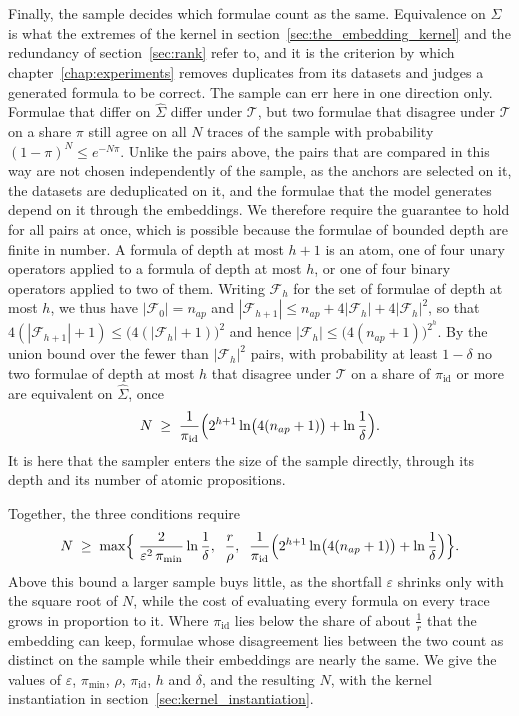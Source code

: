 \documentclass[titlepage,a4paper,11pt]{report}
\begin{document}
    Finally, the sample decides which formulae count as the same. Equivalence on $\widehat\Sigma$ is what the extremes of the kernel in section~\ref{sec:the_embedding_kernel} and the redundancy of section~\ref{sec:rank} refer to, and it is the criterion by which chapter~\ref{chap:experiments} removes duplicates from its datasets and judges a generated formula to be correct. The sample can err here in one direction only. Formulae that differ on $\widehat\Sigma$ differ under $\mathcal T$, but two formulae that disagree under $\mathcal T$ on a share $\pi$ still agree on all $N$ traces of the sample with probability $(1-\pi)^N\le e^{-N\pi}$. Unlike the pairs above, the pairs that are compared in this way are not chosen independently of the sample, as the anchors are selected on it, the datasets are deduplicated on it, and the formulae that the model generates depend on it through the embeddings. We therefore require the guarantee to hold for all pairs at once, which is possible because the formulae of bounded depth are finite in number. A formula of depth at most $h+1$ is an atom, one of four unary operators applied to a formula of depth at most $h$, or one of four binary operators applied to two of them. Writing $\mathcal F_h$ for the set of formulae of depth at most $h$, we thus have $|\mathcal F_0|=n_{ap}$ and $|\mathcal F_{h+1}|\le n_{ap}+4|\mathcal F_h|+4|\mathcal F_h|^2$, so that $4(|\mathcal F_{h+1}|+1)\le\bigl(4(|\mathcal F_h|+1)\bigr)^2$ and hence $|\mathcal F_h|\le\bigl(4(n_{ap}+1)\bigr)^{2^h}$. By the union bound over the fewer than $|\mathcal F_h|^2$ pairs, with probability at least $1-\delta$ no two formulae of depth at most $h$ that disagree under $\mathcal T$ on a share of $\pi_{\mathrm{id}}$ or more are equivalent on $\widehat\Sigma$, once
    \begin{equation}\label{eq:n_identity}
        N\;\ge\;\frac{1}{\pi_{\mathrm{id}}}\Bigl(2^{h+1}\ln\bigl(4(n_{ap}+1)\bigr)+\ln\frac1\delta\Bigr).
    \end{equation}
    It is here that the sampler enters the size of the sample directly, through its depth and its number of atomic propositions.
 
    Together, the three conditions require
    \begin{equation}\label{eq:n_min}
        N\;\ge\;\max\Bigl\{\;\frac{2}{\varepsilon^2\,\pi_{\min}}\ln\frac1\delta,\;\;\frac r\rho,\;\;\frac{1}{\pi_{\mathrm{id}}}\Bigl(2^{h+1}\ln\bigl(4(n_{ap}+1)\bigr)+\ln\frac1\delta\Bigr)\Bigr\}.
    \end{equation}
    Above this bound a larger sample buys little, as the shortfall $\varepsilon$ shrinks only with the square root of $N$, while the cost of evaluating every formula on every trace grows in proportion to it. Where $\pi_{\mathrm{id}}$ lies below the share of about $\frac1r$ that the embedding can keep, formulae whose disagreement lies between the two count as distinct on the sample while their embeddings are nearly the same. We give the values of $\varepsilon$, $\pi_{\min}$, $\rho$, $\pi_{\mathrm{id}}$, $h$ and $\delta$, and the resulting $N$, with the kernel instantiation in section~\ref{sec:kernel_instantiation}.
    
\end{document}
